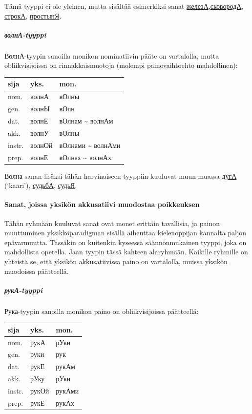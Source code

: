 \documentclass[]{scrartcl}
\begin{document}
Tämä tyyppi ei ole yleinen, mutta sisältää esimerkiksi sanat
\href{http://ru.wiktionary.org/wiki/железа}{железА},\href{http://ru.wiktionary.org/wiki/сковорода}{сковородА},
\href{http://ru.wiktionary.org/wiki/строка}{строкА},
\href{http://ru.wiktionary.org/wiki/простыня}{простынЯ}.

\subparagraph{волнА-tyyppi}\label{ux432ux43eux43bux43dux430-tyyppi}

ВолнА-tyypin sanoilla monikon nominatiivin pääte on vartalolla, mutta
obliikvisijoissa on rinnakkaismuotoja (molempi painovaihtoehto
mahdollinen):

\begin{longtable}[c]{@{}lll@{}}
\toprule
sija & yks. & mon.\tabularnewline
\midrule
\endhead
nom. & волнА & вОлны\tabularnewline
gen. & волнЫ & вОлн\tabularnewline
dat. & волнЕ & вОлнам \textasciitilde{} волнАм\tabularnewline
akk. & волнУ & вОлны\tabularnewline
instr. & волнОй & вОлнами \textasciitilde{} волнАми\tabularnewline
prep. & волнЕ & вОлнах \textasciitilde{} волнАх\tabularnewline
\bottomrule
\end{longtable}

Волна-sanan lisäksi tähän harvinaiseen tyyppiin kuuluvat muun muassa
\href{http://ru.wiktionary.org/wiki/дуга}{дугА} (`kaari'),
\href{http://ru.wiktionary.org/wiki/судьба}{судьбА},
\href{http://ru.wiktionary.org/wiki/судья}{судьЯ}.

\paragraph{Sanat, joissa yksikön akkusatiivi muodostaa
poikkeuksen}\label{sanat-joissa-yksikuxf6n-akkusatiivi-muodostaa-poikkeuksen}

Tähän ryhmään kuuluvat sanat ovat monet erittäin tavallisia, ja painon
muuttuminen yksikköparadigman sisällä aiheuttaa kielenoppijan kannalta
paljon epävarmuutta. Tässäkin on kuitenkin kyseessä säännönmukainen
tyyppi, joka on mahdollista opetella. Jaan tyypin tässä kahteen
alaryhmään. Kaikille ryhmille on yhteistä se, että yksikön
akkusatiivissa paino on vartalolla, muissa yksikön muodoissa päätteellä.

\subparagraph{рукА-tyyppi}\label{ux440ux443ux43aux430-tyyppi}

Рука-tyypin sanoilla monikon paino on obliikvisijoissa päätteellä:

\begin{longtable}[c]{@{}lll@{}}
\toprule
sija & yks. & mon.\tabularnewline
\midrule
\endhead
nom. & рукА & рУки\tabularnewline
gen. & руки & рук\tabularnewline
dat. & рукЕ & рукАм\tabularnewline
akk. & рУку & рУки\tabularnewline
instr. & рукОй & рукАми\tabularnewline
prep. & рукЕ & рукАх\tabularnewline
\bottomrule
\end{longtable}
\end{document}
